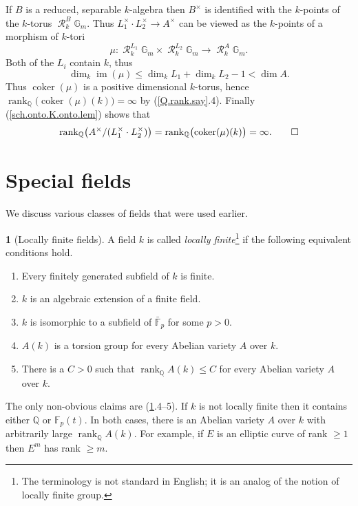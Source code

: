 \documentclass{amsart}
\theoremstyle{definition}
\newtheorem{say}[thm]{}
\theoremstyle{remark}
\newcommand{\f}[0]{{\mathbb F}}
\newcommand{\q}[0]{{\mathbb Q}}
\newcommand{\rank}[0]{\operatorname{rank}}
\newcommand{\qrank}[0]{\operatorname{rank}_{\q}}
\newcommand{\im}[0]{\operatorname{im}}
\newcommand{\coker}[0]{\operatorname{coker}}
\newcommand{\res}[0]{\operatorname{\mathcal R}}
\newcommand{\gm}[0]{{\mathbb G}_m}
\begin{document}
If $B$ is a reduced, separable $k$-algebra then  $B^\times$ is identified with the
$k$-points of the $k$-torus  $\res^B_k\gm$. Thus
$L_1^\times\cdot L_2^\times\to A^\times$ can be viewed as the $k$-points of a morphism of $k$-tori
$$
\mu:  \res^{L_1}_k\gm\times \res^{L_2}_k\gm
{\longrightarrow} \res^{A}_k\gm.
$$
Both of the $L_i$ contain $k$, thus
$$
\dim_k \im(\mu)\leq \dim_k L_1+\dim_k L_2-1<\dim A.
$$
Thus $\coker(\mu)$ is a positive dimensional $k$-torus, hence
$ \qrank \bigl(\coker(\mu)(k)\bigr)=\infty$ by (\ref{Q.rank.say}.4). 
Finally (\ref{sch.onto.K.onto.lem}) shows that
$$
\qrank \bigl(A^\times/(L_1^\times\cdot L_2^\times)\bigr)=\qrank \bigl(\coker(\mu)(k)\bigr)=\infty. \qed
$$






\section{Special fields}\label{spec.fields.sec}


We discuss various classes of fields that were used earlier.


\begin{say}[Locally finite fields]  \label{loc.fin.defn} 
A field $k$ is called {\it locally finite}\footnote{The terminology is not standard in English; it is an  analog of the notion of locally finite group.} if the following equivalent conditions hold.
\begin{enumerate}
\item Every finitely generated subfield of $k$ is finite.
\item $k$ is an algebraic extension of a finite field.
\item $k$ is isomorphic to a subfield of $\bar \f_p$ for some $p>0$.
\item $A(k)$ is a torsion group for every Abelian variety $A$ over $k$.
\item There is a  $C>0$ such that $\qrank A(k)\leq C$ for
 every Abelian variety $A$ over $k$.  
\end{enumerate}
The only non-obvious claims are (\ref{loc.fin.defn}.4--5). 
If $k$ is not locally finite then it
contains either  $\q$ or $\f_p(t)$. In both cases, there is an 
Abelian variety $A$ over $k$ with arbitrarily large 
$\rank_{\q} A(k)$. For example, if $E$ is an elliptic curve of  rank $\geq 1$  then $E^m$ has rank $\geq m$.
\end{say} 
\end{document}
